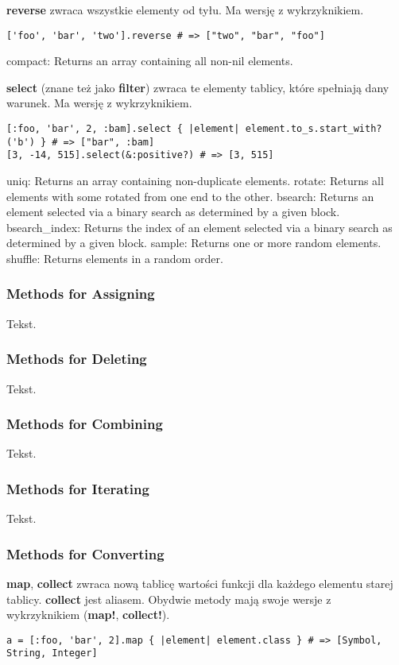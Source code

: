 \textbf{reverse} zwraca wszystkie elementy od tyłu.
Ma wersję z wykrzyknikiem.
\begin{verbatim}
['foo', 'bar', 'two'].reverse # => ["two", "bar", "foo"]
\end{verbatim}

{\footnotesize
compact: Returns an array containing all non-nil elements.
}

\textbf{select} (znane też jako \textbf{filter}) zwraca te elementy tablicy, które spełniają dany warunek.
Ma wersję z wykrzyknikiem.
\begin{verbatim}
[:foo, 'bar', 2, :bam].select { |element| element.to_s.start_with?('b') } # => ["bar", :bam]
[3, -14, 515].select(&:positive?) # => [3, 515]
\end{verbatim}

{\footnotesize
uniq: Returns an array containing non-duplicate elements.
rotate: Returns all elements with some rotated from one end to the other.
bsearch: Returns an element selected via a binary search as determined by a given block.
bsearch\_index: Returns the index of an element selected via a binary search as determined by a given block.
sample: Returns one or more random elements.
shuffle: Returns elements in a random order.
}

\subsubsection{Methods for Assigning}
Tekst.

\subsubsection{Methods for Deleting}
Tekst.

\subsubsection{Methods for Combining}
Tekst.

\subsubsection{Methods for Iterating}
Tekst.

\subsubsection{Methods for Converting}
\textbf{map}, \textbf{collect} zwraca nową tablicę wartości funkcji dla każdego elementu starej tablicy.
\textbf{collect} jest aliasem.
Obydwie metody mają swoje wersje z wykrzyknikiem (\textbf{map!}, \textbf{collect!}).
\begin{verbatim}
a = [:foo, 'bar', 2].map { |element| element.class } # => [Symbol, String, Integer]
\end{verbatim}

